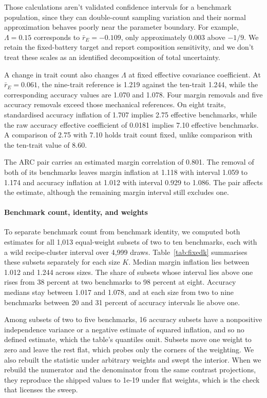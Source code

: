 Those calculations aren't validated confidence intervals for a benchmark population, since they can double-count sampling variation and their normal approximation behaves poorly near the parameter boundary. For example, $\Lambda=0.15$ corresponds to $\bar r_E=-0.109$, only approximately 0.003 above $-1/9$. We retain the fixed-battery target and report composition sensitivity, and we don't treat these scales as an identified decomposition of total uncertainty.

A change in trait count also changes $\Lambda$ at fixed effective covariance coefficient. At $\bar r_E=0.061$, the nine-trait reference is 1.219 against the ten-trait 1.244, while the corresponding accuracy values are 1.070 and 1.078. Four margin removals and five accuracy removals exceed those mechanical references. On eight traits, standardised accuracy inflation of 1.707 implies 2.75 effective benchmarks, while the raw accuracy effective coefficient of 0.0181 implies 7.10 effective benchmarks. A comparison of 2.75 with 7.10 holds trait count fixed, unlike comparison with the ten-trait value of 8.60.

The ARC pair carries an estimated margin correlation of 0.801. The removal of both of its benchmarks leaves margin inflation at 1.118 with interval 1.059 to 1.174 and accuracy inflation at 1.012 with interval 0.929 to 1.086. The pair affects the estimate, although the remaining margin interval still excludes one.


\paragraph{Benchmark count, identity, and weights}
\label{app:composition}
To separate benchmark count from benchmark identity, we computed both estimates for all 1,013 equal-weight subsets of two to ten benchmarks, each with a wild recipe-cluster interval over 4,999 draws. Table~\ref{tab:fixedk} summarises these subsets separately for each size $K$. Median margin inflation lies between 1.012 and 1.244 across sizes. The share of subsets whose interval lies above one rises from 38 percent at two benchmarks to 98 percent at eight. Accuracy medians stay between 1.017 and 1.078, and at each size from two to nine benchmarks between 20 and 31 percent of accuracy intervals lie above one.

Among subsets of two to five benchmarks, 16 accuracy subsets have a nonpositive independence variance or a negative estimate of squared inflation, and so no defined estimate, which the table's quantiles omit. Subsets move one weight to zero and leave the rest flat, which probes only the corners of the weighting. We also rebuilt the statistic under arbitrary weights and swept the interior. When we rebuild the numerator and the denominator from the same contrast projections, they reproduce the shipped values to 1e-19 under flat weights, which is the check that licenses the sweep.

